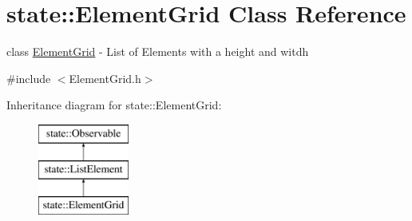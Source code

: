 \hypertarget{classstate_1_1_element_grid}{}\section{state\+:\+:Element\+Grid Class Reference}
\label{classstate_1_1_element_grid}


class \hyperlink{classstate_1_1_element_grid}{Element\+Grid} -\/ List of Elements with a height and witdh  




{\ttfamily \#include $<$Element\+Grid.\+h$>$}

Inheritance diagram for state\+:\+:Element\+Grid\+:\begin{figure}[H]
\begin{center}
\leavevmode
\includegraphics[height=3.000000cm]{classstate_1_1_element_grid}
\end{center}
\end{figure}
